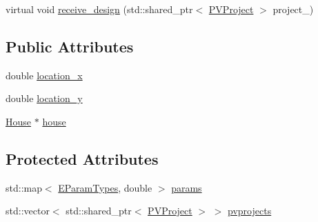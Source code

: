 {\bf }\par
\begin{DoxyCompactItemize}
\item 
virtual void \hyperlink{classsolar__core_1_1_household_a7df346780d3d9683293af565d5831d05}{receive\+\_\+design} (std\+::shared\+\_\+ptr$<$ \hyperlink{classsolar__core_1_1_p_v_project}{P\+V\+Project} $>$ project\+\_\+)
\end{DoxyCompactItemize}

\subsection*{Public Attributes}
{\bf }\par
\begin{DoxyCompactItemize}
\item 
double \hyperlink{classsolar__core_1_1_household_a6596375631a366fdd24270f75548841f}{location\+\_\+x}
\item 
double \hyperlink{classsolar__core_1_1_household_a1ba6b7af82982096e05d99a70a2647eb}{location\+\_\+y}
\end{DoxyCompactItemize}

{\bf }\par
\begin{DoxyCompactItemize}
\item 
\hyperlink{classsolar__core_1_1_house}{House} $\ast$ \hyperlink{classsolar__core_1_1_household_a1104d8264fe733937e1fd2e9ad0f8fc1}{house}
\end{DoxyCompactItemize}

\subsection*{Protected Attributes}
{\bf }\par
\begin{DoxyCompactItemize}
\item 
std\+::map$<$ \hyperlink{namespacesolar__core_aa1147341e5ef7a40d68d1bd68e149362}{E\+Param\+Types}, double $>$ \hyperlink{classsolar__core_1_1_household_a41d61dc3bab971cb19170341b77d9df8}{params}
\end{DoxyCompactItemize}

{\bf }\par
\begin{DoxyCompactItemize}
\item 
std\+::vector$<$ std\+::shared\+\_\+ptr$<$ \hyperlink{classsolar__core_1_1_p_v_project}{P\+V\+Project} $>$ $>$ \hyperlink{classsolar__core_1_1_household_a79c0e955af98669487e0fb472811f842}{pvprojects}
\end{DoxyCompactItemize}

